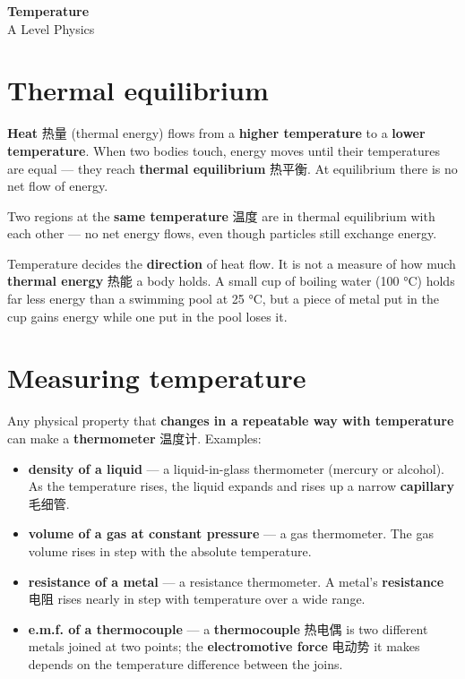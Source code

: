 \documentclass[11pt]{article}
\begin{document}
\begin{center}
  {\LARGE\bfseries Temperature}\\[0.35em]
  {\large A Level Physics}
\end{center}
\vspace{0.6em}

\section*{Thermal equilibrium}

\textbf{Heat} 热量 (thermal energy) flows from a \textbf{higher temperature} to a \textbf{lower temperature}. When two bodies touch, energy moves until their temperatures are equal — they reach \textbf{thermal equilibrium} 热平衡. At equilibrium there is no net flow of energy.

Two regions at the \textbf{same temperature} 温度 are in thermal equilibrium with each other — no net energy flows, even though particles still exchange energy.

Temperature decides the \textbf{direction} of heat flow. It is not a measure of how much \textbf{thermal energy} 热能 a body holds. A small cup of boiling water (100 °C) holds far less energy than a swimming pool at 25 °C, but a piece of metal put in the cup gains energy while one put in the pool loses it.

\section*{Measuring temperature}

Any physical property that \textbf{changes in a repeatable way with temperature} can make a \textbf{thermometer} 温度计. Examples:

\begin{itemize}
\item \textbf{density of a liquid} — a liquid-in-glass thermometer (mercury or alcohol). As the temperature rises, the liquid expands and rises up a narrow \textbf{capillary} 毛细管.

\item \textbf{volume of a gas at constant pressure} — a gas thermometer. The gas volume rises in step with the absolute temperature.

\item \textbf{resistance of a metal} — a resistance thermometer. A metal's \textbf{resistance} 电阻 rises nearly in step with temperature over a wide range.

\item \textbf{e.m.f. of a thermocouple} — a \textbf{thermocouple} 热电偶 is two different metals joined at two points; the \textbf{electromotive force} 电动势 it makes depends on the temperature difference between the joins.

\end{itemize}
\end{document}
